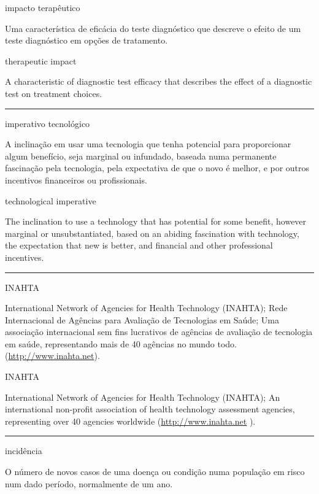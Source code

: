 \documentclass[
  openany]{book}
\begin{document}
impacto terapêutico

Uma característica de eficácia do teste diagnóstico que descreve o efeito de um teste diagnóstico em opções de tratamento.

therapeutic impact

A characteristic of diagnostic test efficacy that describes the effect of a diagnostic test on treatment choices.

\begin{center}\rule{0.5\linewidth}{0.5pt}\end{center}

imperativo tecnológico

A inclinação em usar uma tecnologia que tenha potencial para proporcionar algum benefício, seja marginal ou infundado, baseada numa permanente fascinação pela tecnologia, pela expectativa de que o novo é melhor, e por outros incentivos financeiros ou profissionais.

technological imperative

The inclination to use a technology that has potential for some benefit, however marginal or unsubstantiated, based on an abiding fascination with technology, the expectation that new is better, and financial and other professional incentives.

\begin{center}\rule{0.5\linewidth}{0.5pt}\end{center}

INAHTA

International Network of Agencies for Health Technology (INAHTA); Rede Internacional de Agências para Avaliação de Tecnologias em Saúde; Uma associação internacional sem fins lucrativos de agências de avaliação de tecnologia em saúde, representando mais de 40 agências no mundo todo. (\url{http://www.inahta.net}).

INAHTA

International Network of Agencies for Health Technology (INAHTA); An international non-profit association of health technology assessment agencies, representing over 40 agencies worldwide (\url{http://www.inahta.net} ).

\begin{center}\rule{0.5\linewidth}{0.5pt}\end{center}

incidência

O número de novos casos de uma doença ou condição numa população em risco num dado período, normalmente de um ano.
\end{document}
